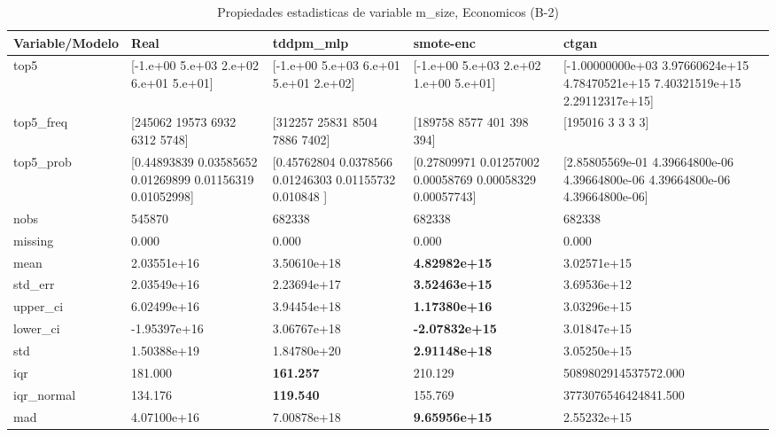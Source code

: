 \begin{table}[H]
\centering
\fontsize{8}{14}\selectfont
\caption{Propiedades  estadisticas de variable m\_size, Economicos (B-2)}
\label{table-stats-economicos-b-2-m_size}
\begin{tabular}{|l|m{10em}|m{10em}|m{10em}|m{10em}|}
\hline
 \rowcolor[gray]{0.8}
Variable/Modelo & Real & tddpm\_mlp & smote-enc & ctgan \\
\hline top5 & [-1.e+00  5.e+03  2.e+02  6.e+01  5.e+01] & [-1.e+00  5.e+03  6.e+01  5.e+01  2.e+02] & [-1.e+00  5.e+03  2.e+02  1.e+00  5.e+01] & [-1.00000000e+03  3.97660624e+15  4.78470521e+15  7.40321519e+15
  2.29112317e+15] \\
\hline top5\_freq & [245062  19573   6932   6312   5748] & [312257  25831   8504   7886   7402] & [189758   8577    401    398    394] & [195016      3      3      3      3] \\
\hline top5\_prob & [0.44893839 0.03585652 0.01269899 0.01156319 0.01052998] & [0.45762804 0.0378566  0.01246303 0.01155732 0.010848  ] & [0.27809971 0.01257002 0.00058769 0.00058329 0.00057743] & [2.85805569e-01 4.39664800e-06 4.39664800e-06 4.39664800e-06
 4.39664800e-06] \\
\hline nobs & 545870 & 682338 & 682338 & 682338 \\
\hline missing & 0.000 & 0.000 & 0.000 & 0.000 \\
\hline mean & 2.03551e+16 & \cellcolor[rgb]{0.9, 0.54, 0.52} 3.50610e+18 & \bfseries 4.82982e+15 & 3.02571e+15 \\
\hline std\_err & 2.03549e+16 & \cellcolor[rgb]{0.9, 0.54, 0.52} 2.23694e+17 & \bfseries 3.52463e+15 & 3.69536e+12 \\
\hline upper\_ci & 6.02499e+16 & \cellcolor[rgb]{0.9, 0.54, 0.52} 3.94454e+18 & \bfseries 1.17380e+16 & 3.03296e+15 \\
\hline lower\_ci & -1.95397e+16 & \cellcolor[rgb]{0.9, 0.54, 0.52} 3.06767e+18 & \bfseries -2.07832e+15 & 3.01847e+15 \\
\hline std & 1.50388e+19 & \cellcolor[rgb]{0.9, 0.54, 0.52} 1.84780e+20 & \bfseries 2.91148e+18 & 3.05250e+15 \\
\hline iqr & 181.000 & \bfseries 161.257 & 210.129 & \cellcolor[rgb]{0.9, 0.54, 0.52} 5089802914537572.000 \\
\hline iqr\_normal & 134.176 & \bfseries 119.540 & 155.769 & \cellcolor[rgb]{0.9, 0.54, 0.52} 3773076546424841.500 \\
\hline mad & 4.07100e+16 & \cellcolor[rgb]{0.9, 0.54, 0.52} 7.00878e+18 & \bfseries 9.65956e+15 & 2.55232e+15 \\

\end{tabular}
\end{table}
